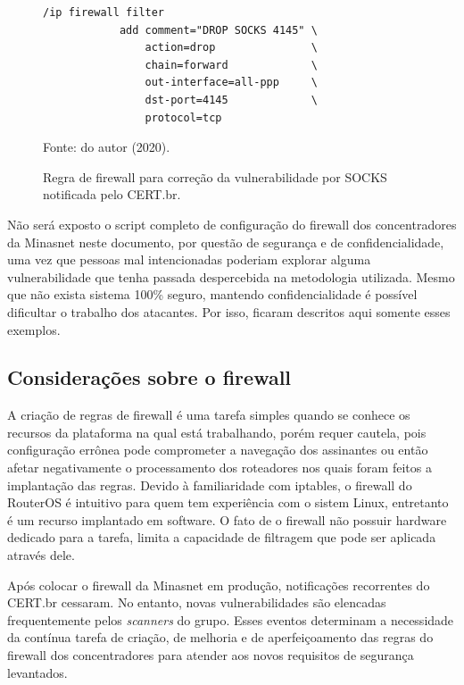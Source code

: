     \begin{figure}[!htb]
        \centering
        \caption{Regra de firewall para correção da vulnerabilidade por SOCKS notificada pelo CERT.br.} 
        \label{fig:drop_socks}
        
        \begin{Verbatim}[fontsize=\normalsize]
            /ip firewall filter
            add comment="DROP SOCKS 4145" \
                action=drop               \
                chain=forward             \
                out-interface=all-ppp     \
                dst-port=4145             \
                protocol=tcp
        \end{Verbatim} 

        {\small Fonte: do autor (2020).} 
    \end{figure}
    
    Não será exposto o script completo de configuração do firewall dos concentradores da Minasnet neste documento, por questão de segurança e de confidencialidade, uma vez que pessoas mal intencionadas poderiam explorar alguma vulnerabilidade que tenha passada despercebida na metodologia utilizada. Mesmo que não exista sistema 100\% seguro, mantendo confidencialidade é possível dificultar o trabalho dos atacantes. Por isso, ficaram descritos aqui somente esses exemplos.
    
\subsection{Considerações sobre o firewall}
    
    A criação de regras de firewall é uma tarefa simples quando se conhece os recursos da plataforma na qual está trabalhando, porém requer cautela, pois configuração errônea pode comprometer a navegação dos assinantes ou então afetar negativamente o processamento dos roteadores nos quais foram feitos a implantação das regras. Devido à familiaridade com iptables, o firewall do RouterOS é intuitivo para quem tem experiência com o sistem Linux, entretanto é um recurso implantado em software. O fato de o firewall não possuir hardware dedicado para a tarefa, limita a capacidade de filtragem que pode ser aplicada através dele.
    
    Após colocar o firewall da Minasnet em produção, notificações recorrentes do CERT.br cessaram. No entanto, novas vulnerabilidades são elencadas frequentemente pelos \textit{scanners} do grupo. Esses eventos determinam a necessidade da contínua tarefa de criação, de melhoria e de aperfeiçoamento das regras do firewall dos concentradores para atender aos novos requisitos de segurança levantados.
    
